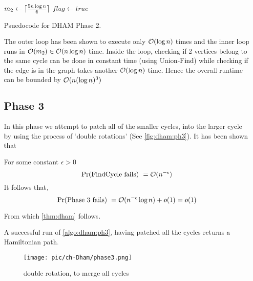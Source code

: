 \begin{algorithm}[!h]
\AlgoFontSize
\DontPrintSemicolon

\BlankLine
$m_2 \leftarrow \lceil\frac{5n \log n}{6}\rceil$\;
$flag \leftarrow true$\;
\caption{Psuedocode for DHAM Phase 2.}
\label{algo:dham:ph2}
\end{algorithm}

The outer loop has been shown to execute only $\mathcal{O}(\log n)$ times and the inner loop runs in $\mathcal{O}(m_2) \in \mathcal{O}(n\log n)$ time. Inside the loop, checking if 2 vertices belong to the same cycle can be done in constant time (using Union-Find) while checking if the edge is in the graph takes another $\mathcal{O}(\log n)$ time. Hence the overall runtime can be bounded by $\mathcal{O}(n(\log n)^3)$


\subsection{Phase 3}
In this phase we attempt to patch all of the smaller cycles, into the larger cycle by using the process of 'double rotations' (See \autoref{fig:dham:ph3}). It has been shown that 
\begin{lemma}
For some constant $\epsilon > 0$
\[ \text{Pr(FindCycle fails) } = \mathcal{O}(n^{-\epsilon}) \]
It follows that, 
\[\text{Pr(Phase 3 fails) } = \mathcal{O}(n^{-\epsilon} \log n) + o(1) = o(1)\]
\end{lemma}
From which \autoref{thm:dham} follows.

A successful run of \autoref{algo:dham:ph3}, having patched all the cycles returns a Hamiltonian path.

\begin{figure}[ht]
\centering
\texttt{[image: pic/ch-Dham/phase3.png]}
\caption{double rotation, to merge all cycles}
\label{fig:dham:ph3}
\end{figure}

